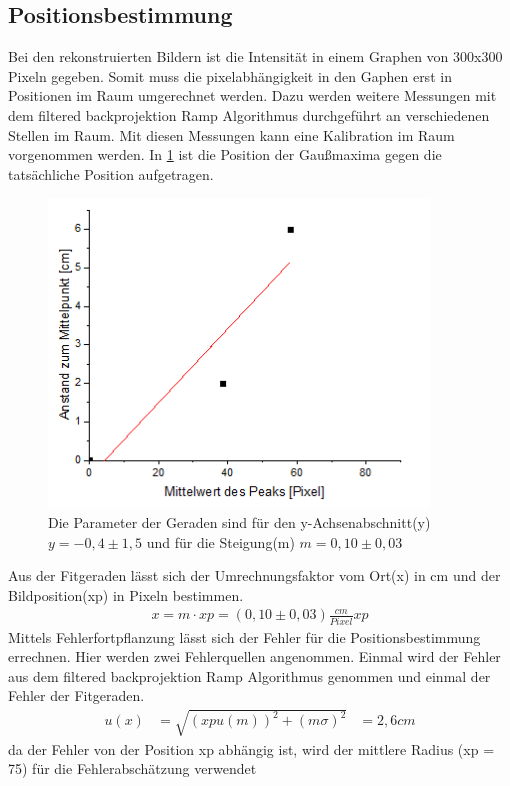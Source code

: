 \subsection{Positionsbestimmung}
Bei den rekonstruierten Bildern ist die Intensität in einem Graphen von 300x300 Pixeln gegeben. Somit muss die pixelabhängigkeit in den Gaphen erst in Positionen im Raum umgerechnet werden. Dazu werden weitere Messungen mit dem filtered backprojektion Ramp Algorithmus durchgeführt an  verschiedenen Stellen im Raum. Mit diesen Messungen kann eine Kalibration im Raum vorgenommen werden. In \cref{oop} ist die Position der Gaußmaxima gegen die tatsächliche Position aufgetragen.
\begin{figure}[h!]
	\centering
	\includegraphics[width=0.9\textwidth]{Position.png}
	\caption{Die Parameter der Geraden sind für den y-Achsenabschnitt(y) $y = -0,4 \pm 1,5$ und für die Steigung(m) $m = 0,10 \pm 0,03 $}
	\label{oop}
\end{figure}
Aus der Fitgeraden lässt sich der Umrechnungsfaktor vom Ort(x) in cm und der Bildposition(xp) in Pixeln bestimmen.
\begin{align}
	x = m \cdot xp =  (0,10 \pm 0,03)\frac{cm}{Pixel} xp
\end{align}
Mittels Fehlerfortpflanzung lässt sich der Fehler für die Positionsbestimmung errechnen.
Hier werden zwei Fehlerquellen angenommen. Einmal wird der Fehler aus dem filtered backprojektion Ramp Algorithmus genommen und einmal der Fehler der Fitgeraden.
\begin{align}
	u(x) &= \sqrt{(xpu(m))^2 + (m\sigma)^2} &= 2,6cm
\end{align}
da der Fehler von der Position xp abhängig ist, wird der mittlere Radius (xp = 75) für die Fehlerabschätzung verwendet

